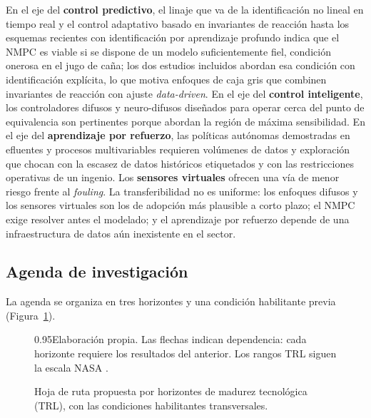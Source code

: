 En el eje del \textbf{control predictivo}, el linaje que va de la
identificación no lineal en tiempo real \parencite{proll1994modelpredictive}
y el control adaptativo basado en invariantes de reacción
\parencite{henson1994adaptive} hasta los esquemas recientes con
identificación por aprendizaje profundo \parencite{durairaj2023deep}
indica que el NMPC es viable si se dispone de un modelo suficientemente
fiel, condición onerosa en el jugo de caña; los dos estudios incluidos
abordan esa condición con identificación explícita, lo que motiva
enfoques de caja gris que combinen invariantes de reacción con ajuste
\textit{data-driven}. En el eje del \textbf{control inteligente}, los
controladores difusos y neuro-difusos diseñados para operar cerca del
punto de equivalencia \parencite{herediamolinero2014feedback,suguna2026advanced}
son pertinentes porque abordan la región de máxima sensibilidad. En el eje
del \textbf{aprendizaje por refuerzo}, las políticas autónomas
demostradas en efluentes y procesos multivariables
\parencite{alvesgoulart2020autonomous,panjapornpon2022reinforcement}
requieren volúmenes de datos y exploración que chocan con la escasez de
datos históricos etiquetados y con las restricciones operativas de un
ingenio. Los \textbf{sensores virtuales}
\parencite{son2021deep,xu2022datadriven,bardeeniz2025artificial} ofrecen
una vía de menor riesgo frente al \textit{fouling}. La transferibilidad no
es uniforme: los enfoques difusos y los sensores virtuales son los de
adopción más plausible a corto plazo; el NMPC exige resolver antes el
modelado; y el aprendizaje por refuerzo depende de una infraestructura
de datos aún inexistente en el sector.

\subsection{Agenda de investigación}
\label{sub:agenda}

La agenda se organiza en tres horizontes y una condición habilitante
previa (Figura~\ref{fig:hoja_ruta}).

\nolinenumbers
\begin{figure}[H]
\centering
\captionsetup{width=0.95\textwidth}
\caption{Hoja de ruta propuesta por horizontes de madurez tecnológica
(TRL), con las condiciones habilitantes transversales.}
\label{fig:hoja_ruta}
\resizebox{0.95\textwidth}{!}{}
\begin{Nota}[Nota]{0.95\textwidth}{Elaboración propia. Las flechas indican
dependencia: cada horizonte requiere los resultados del anterior. Los
rangos TRL siguen la escala NASA \parencite{nasa2016trl}.}
\end{Nota}
\end{figure}
\linenumbers

